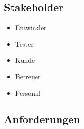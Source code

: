 \documentclass[oneside,a4paper,titlepage]{scrartcl}              %
\begin{document}
\subsection{Stakeholder}
\begin{itemize}
  \item Entwickler
  \item Tester
  \item Kunde
  \item Betreuer
  \item Personal
\end{itemize}

\newpage

\subsection{Anforderungen}

\end{document}
